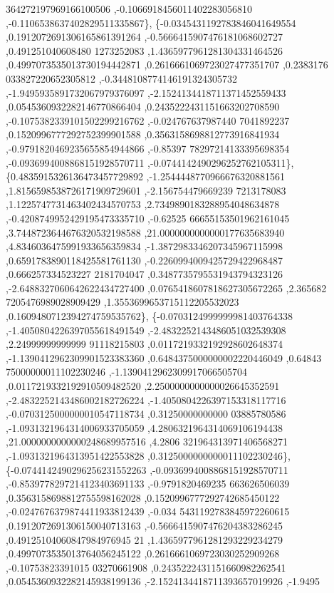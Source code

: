 \begin{DoxyCode}
      364272197969166100506 ,-0.1066918456011402283056810 ,-0.1106538637402829511335867\},
\{-0.0345431192783846041649554 ,0.1912072691306165861391264 ,-0.5666415907476181068602727 ,0.491251040608480
      1273252083 ,1.4365977961281304331464526 ,0.4997073535013730194442871 ,0.2616661069723027477351707 ,0.2383176
      033827220652305812 ,-0.3448108774146191324305732 ,-1.9495935891732067979376097 ,-2.1524134418711371452559433
       ,0.0545360932282146770866404 ,0.2435222431151663202708590 ,-0.1075382339101502299216762 ,-0.024767637987440
      7041892237 ,0.1520996777292752399901588 ,0.3563158698812773916841934 ,-0.9791820469235655854944866 ,-0.85397
      78297214133395698354 ,-0.0936994008868151928570711 ,-0.0744142490296252762105311\},
\{0.4835915326136473457729892 ,-1.2544448770966676320881561 ,1.8156598538726171909729601 ,-2.156754479669239
      7213178083 ,1.1225747731463402434570753 ,2.7349890183288954048634878 ,-0.4208749952429195473335710 ,-0.62525
      66655153501962161045 ,3.7448723644676320532198588 ,21.0000000000000177635683940 ,4.8346036475991933656359834
       ,-1.3872983346207345967115998 ,0.6591783890118425581761130 ,-0.2260994009425729422968487 ,0.666257334523227
      2181704047 ,0.3487735795531943794323126 ,-2.6488327060642622434727400 ,0.0765418607818627305672265 ,2.365682
      7205476989028909429 ,1.3553699653715112205532023 ,0.1609480712394274759535762\},
\{-0.0703124999999981403764338 ,-1.4050804226397055618491549 ,-2.4832252143486051032539308 ,2.24999999999999
      91118215803 ,0.0117219332192928602648374 ,-1.1390412962309901523383360 ,0.6484375000000002220446049 ,0.64843
      75000000011102230246 ,-1.1390412962309917066505704 ,0.0117219332192910509482520 ,2.2500000000000026645352591
       ,-2.4832252143486002182726224 ,-1.4050804226397153318117716 ,-0.0703125000000010547118734 ,0.31250000000000
      03885780586 ,-1.0931321964314006933705059 ,4.2806321964314069106194438 ,21.0000000000000248689957516 ,4.2806
      321964313971406568271 ,-1.0931321964313951422553828 ,0.3125000000000011102230246\},
\{-0.0744142490296256231552263 ,-0.0936994008868151928570711 ,-0.8539778297214123403691133 ,-0.9791820469235
      663626506039 ,0.3563158698812755598162028 ,0.1520996777292742685450122 ,-0.0247676379874411933812439 ,-0.034
      5431192783845972260615 ,0.1912072691306150040713163 ,-0.5666415907476204383286245 ,0.49125104060847984976945
      21 ,1.4365977961281293229234279 ,0.4997073535013764056245122 ,0.2616661069723030252909268 ,-0.10753823391015
      03270661908 ,0.2435222431151660982262541 ,0.0545360932282145938199136 ,-2.1524134418711393657019926 ,-1.9495

\end{DoxyCode}
